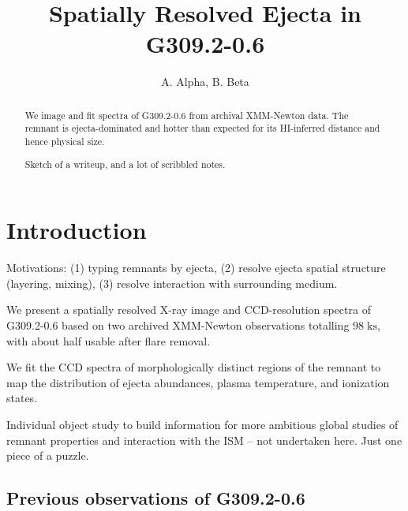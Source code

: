 \documentclass[preprint2,tighten,trackchanges]{aastex6}
\newcommand*{\mt}{\mathrm}
\newcommand*{\unit}[1]{\;\mt{#1}}  %
\newcommand*{\tsup}{\textsuperscript}
\begin{document}
\title{Spatially Resolved Ejecta in G309.2-0.6}

\author{
A. Alpha, B. Beta%
}




\begin{abstract}
We image and fit spectra of G309.2-0.6 from archival XMM-Newton data.
The remnant is ejecta-dominated and hotter than expected for its HI-inferred
distance and hence physical size.

Sketch of a writeup, and a lot of scribbled notes.
\end{abstract}


\section{Introduction} \label{sec:intro}

Motivations:
(1) typing remnants by ejecta,
(2) resolve ejecta spatial structure (layering, mixing),
(3) resolve interaction with surrounding medium.

We present a spatially resolved X-ray image and CCD-resolution spectra of
G309.2-0.6 based on two archived XMM-Newton observations totalling
$98 \unit{ks}$, with about half usable after flare removal.

We fit the CCD spectra of morphologically distinct regions of the remnant to
map the distribution of ejecta abundances, plasma temperature, and ionization
states.

Individual object study to build information for more ambitious global studies
of remnant properties and interaction with the ISM -- not undertaken here.
Just one piece of a puzzle.



\subsection{Previous observations of G309.2-0.6}
\end{document}
